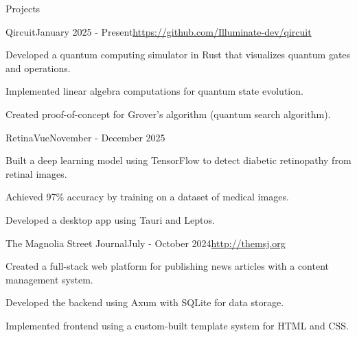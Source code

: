 \documentclass[
	11pt, %
]{resume} %
\begin{document}
\begin{rSection}{Projects}

	\begin{rSubsection}{Qircuit}{January 2025 - Present}{\href{https://github.com/Illuminate-dev/qircuit}{\textnormal{https://github.com/Illuminate-dev/qircuit}}}{}
		\item Developed a quantum computing simulator in Rust that visualizes quantum gates and operations. 
		\item Implemented linear algebra computations for quantum state evolution.
		\item Created proof-of-concept for Grover’s algorithm (quantum search algorithm).
	\end{rSubsection}


	\begin{rSubsection}{RetinaVue}{November - December 2025}{}{}
		\item Built a deep learning model using TensorFlow to detect diabetic retinopathy from retinal images.
		\item Achieved 97\% accuracy by training on a dataset of medical images.
		\item Developed a desktop app using Tauri and Leptos.
	\end{rSubsection}


	\begin{rSubsection}{The Magnolia Street Journal}{July - October 2024}{\href{http://themsj.org}{\textnormal{http://themsj.org}}}{}
		\item Created a full-stack web platform for publishing news articles with a content management system.
		\item Developed the backend using Axum with SQLite for data storage.
		\item Implemented frontend using a custom-built template system for HTML and CSS.
	\end{rSubsection}

\end{rSection}

\end{document}
